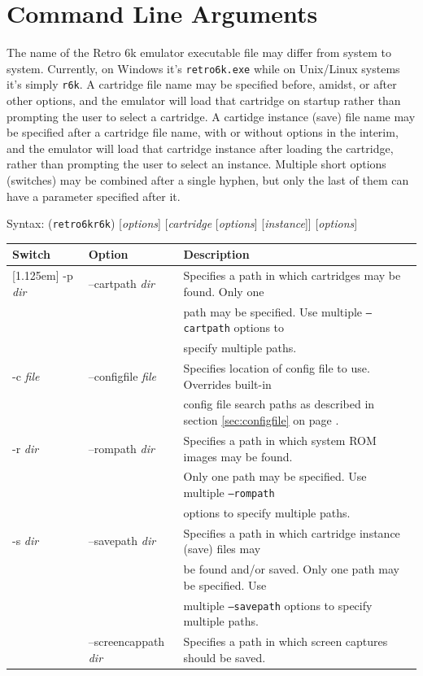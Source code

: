 \documentclass[12pt]{{memoir}}
\newcommand\Hline{%
\hline\raisebox{0pt}[1.125em]{}}
\begin{document}
\section{Command Line Arguments}

The name of the Retro 6k emulator executable file may differ from system to system. Currently, on Windows it's \texttt{retro6k.exe} while on Unix/Linux systems it's simply \texttt{r6k}. A cartridge file name may be specified before, amidst, or after other options, and the emulator will load that cartridge on startup rather than prompting the user to select a cartridge. A cartidge instance (save) file name may be specified after a cartridge file name, with or without options in the interim, and the emulator will load that cartridge instance after loading the cartridge, rather than prompting the user to select an instance. Multiple short options (switches) may be combined after a single hyphen, but only the last of them can have a parameter specified after it.

\begin{center}
Syntax: (\texttt{retro6k}\textbar\texttt{r6k}) [\textit{options}] [\textit{cartridge} [\textit{options}] [\textit{instance}]] [\textit{options}]

\vspace{1em plus 1em minus 1em}

\begin{tabular}{>{\ttfamily}l>{\ttfamily}ll}
\textrm{Switch} & \textrm{Option} & Description \\
\Hline
-p \textrm{\textit{dir}} & --cartpath \textrm{\textit{dir}} & Specifies a path in which cartridges may be found. Only one \\
& & path may be specified. Use multiple \texttt{--cartpath} options to \\
& & specify multiple paths. \\
-c \textrm{\textit{file}} & --configfile \textrm{\textit{file}} & Specifies location of config file to use. Overrides built-in \\
& & config file search paths as described in section \ref{sec:configfile} on page \pageref{ss:configloc}. \\
-r \textrm{\textit{dir}} & --rompath \textrm{\textit{dir}} & Specifies a path in which system ROM images may be found. \\
& & Only one path may be specified. Use multiple \texttt{--rompath} \\
& & options to specify multiple paths. \\
-s \textrm{\textit{dir}} & --savepath \textrm{\textit{dir}} & Specifies a path in which cartridge instance (save) files may \\
& & be found and/or saved. Only one path may be specified. Use \\
& & multiple \texttt{--savepath} options to specify multiple paths. \\
& --screencappath \textrm{\textit{dir}} & Specifies a path in which screen captures should be saved.\\
\end{tabular}
\end{center}
\end{document}
